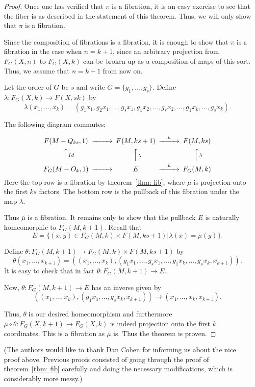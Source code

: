 \documentclass{amsart}
\begin{document}
\begin{proof}
Once one has verified that $\pi$ is a fibration, it is an easy exercise
to see that the fiber is as described in the statement of this theorem.
Thus, we will only show that $\pi$ is a fibration. 

Since the composition
of fibrations is a fibration, it is enough to show that $\pi$ is
a fibration in the case when $n=k+1$, since an arbitrary projection
from $F_G(X,n)$ to $F_G(X,k)$ can be broken up as a composition of maps
of this sort. Thus, we assume that $n=k+1$ from now on. 

Let the order of $G$ be $s$ and write $G=\{g_1,\dots,g_s\}$. 
Define $\lambda: F_G(X,k) \rightarrow F(X,sk)$ by 
$$
\lambda(x_1,\dots,x_k) = 
(g_1x_1,g_2x_1,\dots,g_sx_1,g_1x_2,\dots,g_sx_2,\dots,g_1x_k,\dots,g_sx_k).
$$

The following diagram commutes:

$$
\begin{CD}
F(M-Q_{ks},1) @>>> F(M, ks+1) @> \mu >> F(M,ks) \\ 
@AA Id A @AA \bar{\lambda} A @AA \lambda A \\
F_G(M-O_k,1) @>>> E @> \bar{\mu} >> F_G(M,k)
\end{CD}
$$
Here the top row is a fibration by theorem~\ref{thm: fib}, 
where $\mu$ is projection onto the
first $ks$ factors. The bottom row is the pullback of this fibration
under
the map $\lambda$. 

Thus $\bar{\mu}$ is a fibration. It remains only to show that the pullback
$E$
is naturally homeomorphic to $F_G(M,k+1)$. Recall that 
$$
E=\{(x,y) \in F_G(M,k) \times F(M,ks+1) | \lambda(x)=\mu(y)\}.
$$

Define $\theta: F_G(M,k+1) \rightarrow F_G(M,k) \times F(M,ks+1)$
by
$$
\theta(x_1,\dots,x_{k+1})=
((x_1,\dots,x_k), (g_1x_1,\dots,g_sx_1,\dots,g_1x_k,\dots,g_sx_k,x_{k+1})).
$$
It is easy to check that in fact $\theta: F_G(M,k+1) \rightarrow E$.

Now, $\theta: F_G(M,k+1) \rightarrow E$ has an inverse given by
$$
((x_1,\dots,x_k),(g_1x_1,\dots,g_sx_k,x_{k+1}))
\rightarrow
(x_1,\dots,x_k,x_{k+1}).
$$

Thus, $\theta$ is our desired homeomorphism and furthermore
$\bar{\mu} \circ \theta: F_G(X,k+1) \rightarrow F_G(X,k)$ is indeed 
projection onto the first $k$ coordinates.
This is a fibration as $\bar{\mu}$ is. Thus the theorem is proven. 
\end{proof}

(The authors would like to thank Dan Cohen for informing us about
the nice proof above. Previous proofs consisted of going through the
proof of theorem~\ref{thm: fib} carefully and doing the necessary
modifications, which is considerably more messy.)
\end{document}
